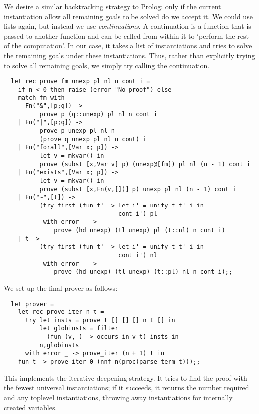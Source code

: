 We desire a similar backtracking strategy to Prolog: only if the current
instantiation allow all remaining goals to be solved do we accept it. We could
use lists again, but instead we use {\em continuations}. A continuation is a
function that is passed to another function and can be called from within it to
`perform the rest of the computation'. In our case, it takes a list of
instantiations and tries to solve the remaining goals under these
instantiations. Thus, rather than explicitly trying to solve all remaining
goals, we simply try calling the continuation.

\begin{boxed}\begin{lstlisting}
  let rec prove fm unexp pl nl n cont i =
    if n < 0 then raise (error "No proof") else
    match fm with
      Fn("&",[p;q]) ->
          prove p (q::unexp) pl nl n cont i
    | Fn("|",[p;q]) ->
          prove p unexp pl nl n
          (prove q unexp pl nl n cont) i
    | Fn("forall",[Var x; p]) ->
          let v = mkvar() in
          prove (subst [x,Var v] p) (unexp@[fm]) pl nl (n - 1) cont i
    | Fn("exists",[Var x; p]) ->
          let v = mkvar() in
          prove (subst [x,Fn(v,[])] p) unexp pl nl (n - 1) cont i
    | Fn("~",[t]) ->
          (try first (fun t' -> let i' = unify t t' i in
                                cont i') pl
           with error _ ->
              prove (hd unexp) (tl unexp) pl (t::nl) n cont i)
    | t ->
          (try first (fun t' -> let i' = unify t t' i in
                                cont i') nl
           with error _ ->
              prove (hd unexp) (tl unexp) (t::pl) nl n cont i);;
\end{lstlisting}\end{boxed}

\noindent We set up the final prover as follows:

\begin{boxed}\begin{lstlisting}
  let prover =
    let rec prove_iter n t =
      try let insts = prove t [] [] [] n I [] in
          let globinsts = filter
            (fun (v,_) -> occurs_in v t) insts in
          n,globinsts
      with error _ -> prove_iter (n + 1) t in
    fun t -> prove_iter 0 (nnf_n(proc(parse_term t)));;
\end{lstlisting}\end{boxed}

This implements the iterative deepening strategy. It tries to find the proof
with the fewest universal instantiations; if it succeeds, it returns the number
required and any toplevel instantiations, throwing away instantiations for
internally created variables.

